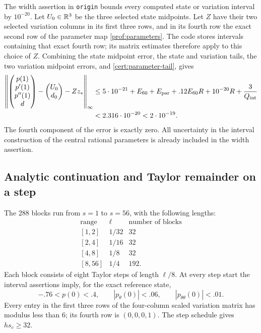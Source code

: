 The width assertion in \texttt{origin} bounds every computed state or
variation interval by \(10^{-20}\).
Let \(U_0\in\mathbb{R}^3\) be the three selected state midpoints.
Let \(Z\) have their two selected variation columns in its first three
rows, and in its fourth row the exact second row of the parameter map
\eqref{prof:parameters}.  The code stores intervals containing that exact
fourth row; its matrix estimates therefore apply to this choice of \(Z\).
Combining the state midpoint error, the state and variation tails,
the two variation midpoint errors, and \eqref{cert:parameter-tail}, gives
\begin{align}
 \left\|
 \begin{pmatrix}p(1)\\p'(1)\\p''(1)\\d\end{pmatrix}
 -\begin{pmatrix}U_0\\d_0\end{pmatrix}-Zz_*
 \right\|_\infty
 &\le 5\cdot10^{-21}+E_{60}+E_{\rm par}
        +.12E_{60}R+10^{-20}R+\frac3{Q_{\rm int}}\notag\\
 &<2.316\cdot10^{-20}<2\cdot10^{-19}.
 \label{cert:initial-error}
\end{align}
The fourth component of the error is exactly zero.
All uncertainty in the interval construction of the central rational
parameters is already included in the width assertion.

\subsection{Analytic continuation and Taylor remainder on a step}
\label{cert:disks}

The 288 blocks run from \(s=1\) to \(s=56\), with the following lengths:
\[
 \begin{array}{c|c|c}
 \text{range}&\ell&\text{number of blocks}\\ \hline
 {[1,2]}&1/32&32\\
 {[2,4]}&1/16&32\\
 {[4,8]}&1/8&32\\
 {[8,56]}&1/4&192.
 \end{array}
\]
Each block consists of eight Taylor steps of length \(\ell/8\).
At every step start the interval assertions imply, for the exact reference
state,
\begin{equation}\label{cert:step-start}
 -.76<p(0)<.4,\qquad |p_\theta(0)|<.06,\qquad
 |p_{\theta\theta}(0)|<.01.
\end{equation}
Every entry in the first three rows of the four-column scaled variation
matrix has modulus less than \(6\); its fourth row is \((0,0,0,1)\).
The step schedule gives \(hs_c\ge32\).


